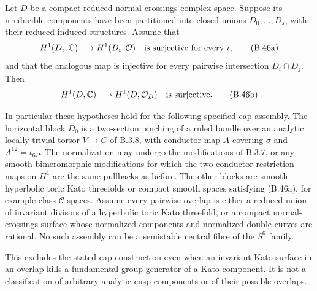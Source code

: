 \begin{proposition}\label{push:B46}
Let $D$ be a compact reduced normal-crossings complex
space. Suppose its irreducible components have been
partitioned into closed unions $D_0,\ldots,D_s$, with
their reduced induced structures. Assume that
\[
 H^1(D_i,\mathbb C)\longrightarrow H^1(D_i,\mathcal O)
 \quad\hbox{is surjective for every }i,
 \tag{B.46a}
\]
and that the analogous map is injective for every
pairwise intersection $D_i\cap D_j$. Then
\[
 H^1(D,\mathbb C)\longrightarrow H^1(D,\mathcal O_D)
 \quad\hbox{is surjective}.
 \tag{B.46b}
\]

In particular these hypotheses hold for the following
specified cap assembly. The horizontal block $D_0$ is
a two-section pinching of a ruled bundle over an
analytic locally trivial torsor $V\to C$ of B.3.8,
with conductor map $A$ covering $\sigma$ and
$A^{12}=t_{6P}$. The normalization may undergo the
modifications of B.3.7, or any smooth bimeromorphic
modifications for which the two conductor restriction
maps on $H^1$ are the same pullbacks as before.
The other blocks are smooth hyperbolic toric Kato
threefolds or compact smooth spaces satisfying
(B.46a), for example class-$\mathcal C$ spaces.
Assume every pairwise overlap is either a reduced
union of invariant divisors of a hyperbolic toric
Kato threefold, or a compact normal-crossings surface
whose normalized components and normalized double
curves are rational. No such assembly can be a
semistable central fibre of the $S^6$ family.

This excludes the stated cap construction even when
an invariant Kato surface in an overlap kills a
fundamental-group generator of a Kato component.
It is not a classification of arbitrary analytic
cusp components or of their possible overlaps.
\end{proposition}
